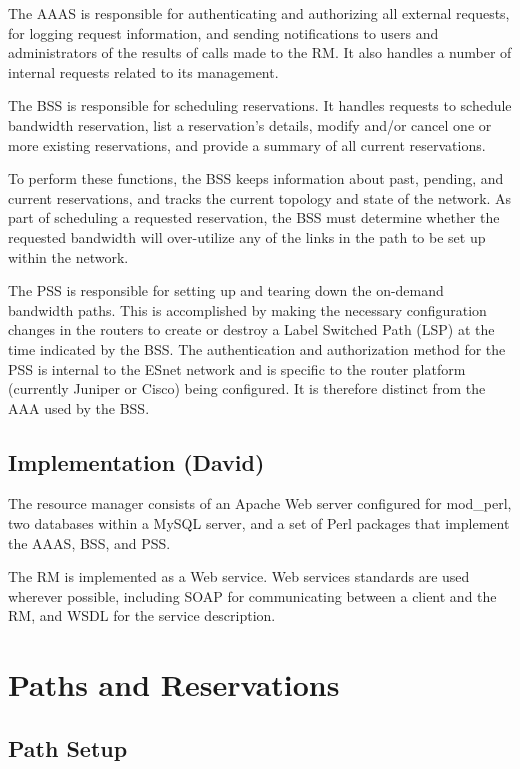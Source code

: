 \documentclass[conference]{IEEEtran}
\begin{document}
The AAAS is responsible for authenticating and authorizing all external 
requests, for logging request information, and sending notifications to
users and administrators of the results of calls made to the RM.  It also
handles a number of internal requests related to its management.

The BSS is responsible for scheduling reservations.  It handles
requests to schedule bandwidth reservation, list a reservation's details,
modify and/or cancel one or more existing reservations, and provide a summary
of all current reservations.

To perform these functions, the BSS keeps information about past,
pending, and current reservations, and tracks the current topology and state of
the network.  As part of scheduling a requested reservation, the BSS must
determine whether the requested bandwidth will over-utilize any of the links
in the path to be set up within the network.

The PSS is responsible for setting up and tearing down the on-demand bandwidth 
paths. This is accomplished by making the necessary configuration changes in 
the routers to create or destroy a Label Switched Path (LSP) at the time
indicated by the BSS. The authentication and authorization method for the PSS 
is internal to the ESnet network and is specific to the router platform 
(currently Juniper or Cisco) being configured.  It is therefore distinct from 
the AAA used by the BSS.

\subsection{Implementation (David)}

The resource manager consists of an Apache Web server configured for
mod\_perl, two databases within a MySQL server, and a set of Perl 
packages that implement the AAAS, BSS, and PSS.

The RM is implemented as a Web service.
Web services standards are used wherever possible, including SOAP
for communicating between a client and the RM, and WSDL for the service
description. 
 
\section{Paths and Reservations}

\subsection{Path Setup}
\end{document}
